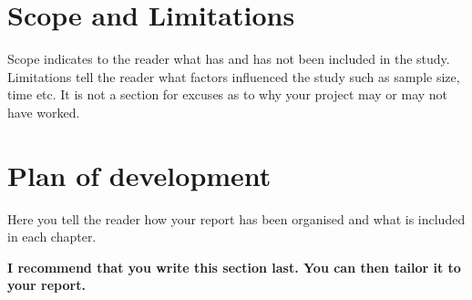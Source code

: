 \section{Scope and Limitations}
Scope indicates to the reader what has and has not been included in the study. Limitations tell the
reader what factors influenced the study such as sample size, time etc. It is not a section for excuses as
to why your project may or may not have worked.

\section{Plan of development}
Here you tell the reader how your report has been organised and what is included in each
chapter.

{\bf I recommend that you write this section last. You can then tailor it to your report.}
